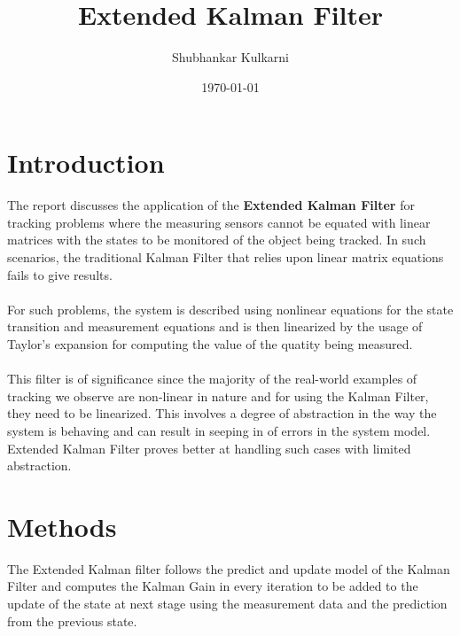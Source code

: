 \documentclass{article}
\begin{document}
\title{Extended Kalman Filter} 
\author{Shubhankar Kulkarni}
\date{\today}
\maketitle

\section{Introduction}
The report discusses the application of the \textbf{Extended Kalman Filter} for tracking problems where the measuring sensors cannot be equated with linear matrices with the states to be monitored of the object being tracked. In such scenarios, the traditional Kalman Filter that relies upon linear matrix equations fails to give results.
\paragraph{}	For such problems, the system is described using nonlinear equations for the state transition and measurement equations and is then linearized by the usage of Taylor's expansion for computing the value of the quatity being measured.
\paragraph{}	This filter is of significance since the majority of the real-world examples of tracking we observe are non-linear in nature and for using the Kalman Filter, they need to be linearized. This involves a degree of abstraction in the way the system is behaving and can result in seeping in of errors in the system model. Extended Kalman Filter proves better at handling such cases with limited abstraction.
\newpage
\section{Methods}
	The Extended Kalman filter follows the predict and update model of the Kalman Filter and computes the Kalman Gain in every iteration to be added to the update of the state at next stage using the measurement data and the prediction from the previous state. 
\end{document}
